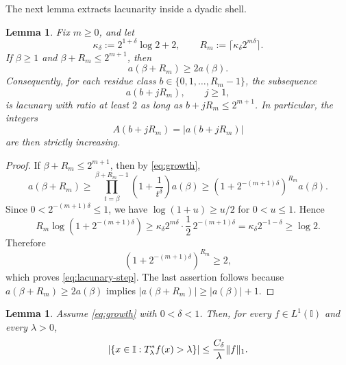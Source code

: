 \documentclass[11pt]{amsart}
\numberwithin{equation}{section}
\newtheorem{lemma}[theorem]{Lemma}
\theoremstyle{remark}
\begin{document}
The next lemma extracts lacunarity inside a dyadic shell.

\begin{lemma}
\label{lem:lacunary-blocks} Fix $m\ge0$, and let 
\begin{equation*}
\kappa_\delta:=2^{1+\delta}\log 2+2, \qquad R_m:=\bigl\lceil \kappa_\delta
2^{m\delta}\bigr\rceil. 
\end{equation*}
If $\beta\ge1$ and $\beta+R_m\le 2^{m+1}$, then 
\begin{equation}
a(\beta+R_m)\ge 2a(\beta).  \label{eq:lacunary-step}
\end{equation}
Consequently, for each residue class $b\in\{0,1,\dots,R_m-1\}$, the
subsequence 
\begin{equation*}
a(b+jR_m),\qquad j\ge1, 
\end{equation*}
is lacunary with ratio at least $2$ as long as $b+jR_m\le2^{m+1}$. In
particular, the integers 
\begin{equation*}
A(b+jR_m)=|a(b+jR_m)| 
\end{equation*}
are then strictly increasing.
\end{lemma}

\begin{proof}
If $\beta+R_m\le 2^{m+1}$, then by \eqref{eq:growth}, 
\begin{equation*}
a(\beta+R_m) \ge
\prod_{t=\beta}^{\beta+R_m-1}\left(1+\frac1{t^\delta}\right)a(\beta) \ge
\left(1+2^{-(m+1)\delta}\right)^{R_m}a(\beta). 
\end{equation*}
Since $0<2^{-(m+1)\delta}\le1$, we have $\log(1+u)\ge u/2$ for $0<u\le1$.
Hence 
\begin{equation*}
R_m\log\left(1+2^{-(m+1)\delta}\right) \ge \kappa_\delta 2^{m\delta}\cdot
\frac12\,2^{-(m+1)\delta} = \kappa_\delta 2^{-1-\delta} \ge \log 2. 
\end{equation*}
Therefore 
\begin{equation*}
\left(1+2^{-(m+1)\delta}\right)^{R_m}\ge2, 
\end{equation*}
which proves \eqref{eq:lacunary-step}. The last assertion follows because $%
a(\beta+R_m)\ge2a(\beta)$ implies $|a(\beta+R_m)|\ge |a(\beta)|+1$.
\end{proof}

\begin{lemma}
\label{lem:T-weak} Assume \eqref{eq:growth} with $0<\delta<1$. Then, for
every $f\in L^1(\mathbb{I})$ and every $\lambda>0$, 
\begin{equation}
\lvert \{x\in\mathbb{I}:T_\lambda^*f(x)>\lambda\}\rvert \le \frac{C_\delta}{%
\lambda}\lVert f\rVert_1.  \label{eq:T-weak}
\end{equation}
\end{lemma}
\end{document}
